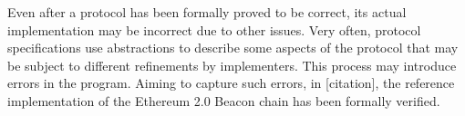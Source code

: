Even after a protocol has been formally proved to be correct, its actual implementation may be incorrect due to other issues. Very often, protocol specifications use abstractions to describe some aspects of the protocol that may be subject to different refinements by implementers. This process may introduce errors in the program. Aiming to capture such errors, in [citation], the reference implementation of the Ethereum 2.0 Beacon chain has been formally verified.

